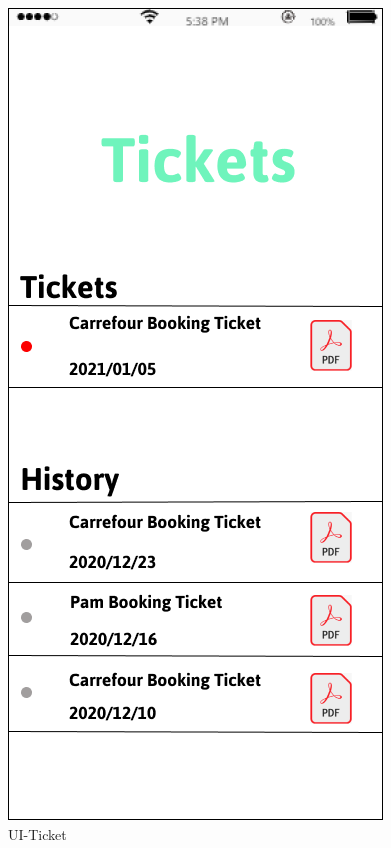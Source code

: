 \documentclass[a4paper,12pt]{report}
\begin{document}
\begin{figure}[H]
	\begin{minipage}[t]{0.56\linewidth}
		\centering
		\includegraphics[scale=0.5]{UI-Ticket}
		\caption{UI-Ticket}
		\label{UI-Ticket}
	\end{minipage}%
	\begin{minipage}[t]{0.56\linewidth}
		\centering

\end{minipage}
\end{figure}
\end{document}

